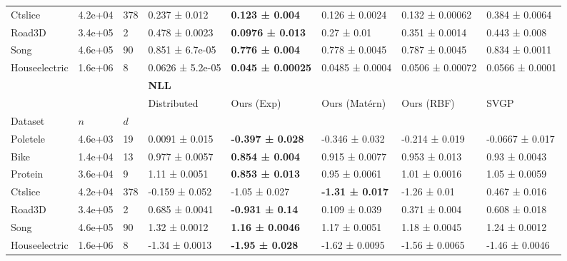 \begin{table}[ht]
\begin{tabularx}{\textwidth}{llllllll}
Ctslice & 4.2e+04 & 378 & 0.237 ± 0.012 & \bfseries 0.123 ± 0.004 & 0.126 ± 0.0024 & 0.132 ± 0.00062 & 0.384 ± 0.0064 \\
Road3D & 3.4e+05 & 2 & 0.478 ± 0.0023 & \bfseries 0.0976 ± 0.013 & 0.27 ± 0.01 & 0.351 ± 0.0014 & 0.443 ± 0.008 \\
Song & 4.6e+05 & 90 & 0.851 ± 6.7e-05 & \bfseries 0.776 ± 0.004 & 0.778 ± 0.0045 & 0.787 ± 0.0045 & 0.834 ± 0.0011 \\
Houseelectric & 1.6e+06 & 8 & 0.0626 ± 5.2e-05 & \bfseries 0.045 ± 0.00025 & 0.0485 ± 0.0004 & 0.0506 ± 0.00072 & 0.0566 ± 0.0001 \\
\bottomrule
\toprule
 &  &  & \multicolumn{5}{l}{\textbf{NLL}} \\
 &  &  & Distributed & Ours (Exp) & Ours (Matérn) & Ours (RBF) & SVGP \\
Dataset & \(n\) & \(d\) &  &  &  &  &  \\
\midrule
Poletele & 4.6e+03 & 19 & 0.0091 ± 0.015 & \bfseries -0.397 ± 0.028 & -0.346 ± 0.032 & -0.214 ± 0.019 & -0.0667 ± 0.017 \\
Bike & 1.4e+04 & 13 & 0.977 ± 0.0057 & \bfseries 0.854 ± 0.004 & 0.915 ± 0.0077 & 0.953 ± 0.013 & 0.93 ± 0.0043 \\
Protein & 3.6e+04 & 9 & 1.11 ± 0.0051 & \bfseries 0.853 ± 0.013 & 0.95 ± 0.0061 & 1.01 ± 0.0016 & 1.05 ± 0.0059 \\
Ctslice & 4.2e+04 & 378 & -0.159 ± 0.052 & -1.05 ± 0.027 & \bfseries -1.31 ± 0.017 & -1.26 ± 0.01 & 0.467 ± 0.016 \\
Road3D & 3.4e+05 & 2 & 0.685 ± 0.0041 & \bfseries -0.931 ± 0.14 & 0.109 ± 0.039 & 0.371 ± 0.004 & 0.608 ± 0.018 \\
Song & 4.6e+05 & 90 & 1.32 ± 0.0012 & \bfseries 1.16 ± 0.0046 & 1.17 ± 0.0051 & 1.18 ± 0.0045 & 1.24 ± 0.0012 \\
Houseelectric & 1.6e+06 & 8 & -1.34 ± 0.0013 & \bfseries -1.95 ± 0.028 & -1.62 ± 0.0095 & -1.56 ± 0.0065 & -1.46 ± 0.0046 \\
\bottomrule
\end{tabularx}
\end{table}
